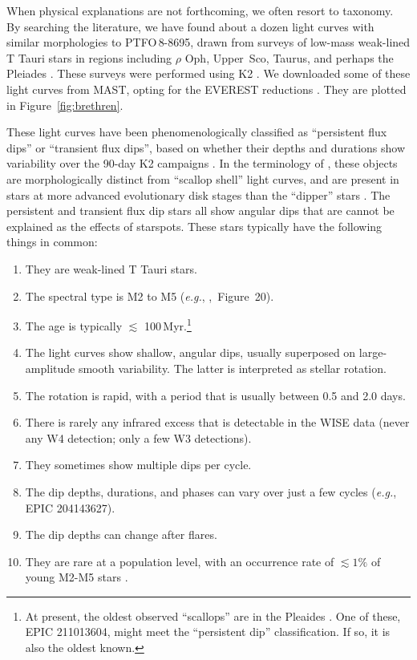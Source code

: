 \documentclass[12pt,twocolumn,tighten]{aastex62}
\newcommand{\ptfo}{PTFO$\,$8-8695}
\begin{document}
When physical explanations are not forthcoming, we often resort to
taxonomy.  By searching the literature, we have found about a dozen
light curves with similar morphologies to \ptfo, drawn from surveys of
low-mass weak-lined T Tauri stars in regions including $\rho$ Oph,
Upper~Sco, Taurus, and perhaps the Pleiades
\citep{rebull_rotation_2016,david_transient_2017,stauffer_orbiting_2017,stauffer_rotevol_2018,rebull_usco_2018,rebull_rotation_2020}.
These surveys were performed using K2 \citep{howell_k2_2014}.  We
downloaded some of these light curves from MAST, opting for the
EVEREST reductions \citep{luger_everest_2016,luger_update_2018}.  They
are plotted in Figure~\ref{fig:brethren}.

These light curves have been phenomenologically classified as
``persistent flux dips'' or ``transient flux dips'', based on whether
their depths and durations show variability over the 90-day K2
campaigns \citep{stauffer_orbiting_2017}.  In the terminology of
\citet{stauffer_orbiting_2017}, these objects are morphologically
distinct from ``scallop shell'' light curves, and are present in stars
at more advanced evolutionary disk stages than the ``dipper'' stars
\citep{ansdell_young_2016,cody_manyfaceted_2018}.  The persistent and
transient flux dip stars all show angular dips that are cannot be
explained as the effects of starspots.  These stars typically have the
following things in common:
\begin{enumerate}[topsep=0.5ex,itemsep=-0.5ex,partopsep=1ex,parsep=1.5ex]
  \item They are weak-lined T Tauri stars.
  \item The spectral type is M2 to M5 ({\it e.g.},
    \citealt{rebull_usco_2018},~Figure~20).
  \item The age is typically $\lesssim$ 100$\,$Myr.\footnote{ At
    present, the oldest observed ``scallops'' are in the Pleaides
    \citep{rebull_rotation_2016}. One of these, EPIC 211013604, might
    meet the ``persistent dip'' classification.  If so, it is also the
    oldest known.} 
  \item The light curves show shallow, angular dips, usually
    superposed on large-amplitude smooth variability. The latter is
    interpreted as stellar rotation.
  \item The rotation is rapid, with a period that is usually between
    0.5 and 2.0 days.
  \item There is rarely any infrared excess that is detectable in the
    WISE data (never any W4 detection; only a few W3 detections).
  \item They sometimes show multiple dips per cycle.
  \item The dip depths, durations, and phases can vary over just a few
    cycles ({\it e.g.}, EPIC 204143627).
  \item The dip depths can change after flares.
  \item They are rare at a population level, with an occurrence rate
    of $\lesssim 1\%$ of young M2-M5 stars \citep{rebull_usco_2018}.
\end{enumerate}
\end{document}
